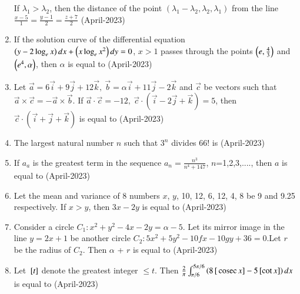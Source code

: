 \documentclass[journal]{IEEEtran}
\numberwithin{equation}{enumi}
\numberwithin{figure}{enumi}
\begin{document}
\begin{enumerate}[start=16]
If $\lambda_1 > \lambda_2$, then the distance of the point $(\lambda_1 - \lambda_2, \lambda_2, \lambda_1)$ 
from the line $\frac{x - 5}{1} = \frac{y - 1}{2} = \frac{z + 7}{2}$
\hfill(April-2023)
\item If the solution curve of the differential equation $\left(y - 2 \log_e x\right)dx + \left(x \log_e x^2\right)dy = 0$, $x > 1$ passes through the points $\left(e, \frac{4}{3}\right)$ and  $\left(e^4, \alpha\right)$, then $\alpha$ is equal to 
\hfill(April-2023)
\item Let \(\vec{a} = 6\vec{i} + 9\vec{j} + 12\vec{k}, \ \vec{b} = \alpha\vec{i} + 11\vec{j} - 2\vec{k}\) and \(\vec{c}\) be vectors such that \(\vec{a} \times \vec{c} = -\vec{a} \times \vec{b}\). If \(\vec{a} \cdot \vec{c} = -12, \ \vec{c} \cdot (\vec{i} - 2\vec{j} + \vec{k}) = 5\), then \(\vec{c} \cdot (\vec{i} + \vec{j} + \vec{k})\) is equal to 
\hfill(April-2023)
\item The largest natural number $n$ such that $3^n$ divides 66! is
\hfill(April-2023)
\item If $a_a$ is the greatest term in the sequence $a_n=\frac{n^3}{n^4 + 147}$, $n$=1,2,3,...., then $a$ is equal to 
\hfill(April-2023)
\item Let the mean and variance of 8 numbers $x$, $y$, 10, 12, 6, 12, 4, 8 be 9 and 9.25 respectively. If $x>y$, then $3x-2y$ is equal to 
\hfill(April-2023)
\item Consider a circle $C_1 : x^2+y^2-4x-2y=\alpha-5$. Let its mirror  image in the line $y=2x+1$ be another circle $C_2 : 5x^2+5y^2 -10fx-10gy+36=0 $.Let $r$ be the radius of $C_2$. Then $\alpha$ + $r$ is equal to
\hfill(April-2023)
\item Let ${}\left[t\right]$ denote the greatest integer $\leq t$. Then $\frac{2}{\pi} \int_{\pi/6}^{5\pi/6} \left(8{}\left[\,\text{cosec}\, x\right] - 5{}\left[\cot x\right] \right) dx$ is equal to 
\hfill(April-2023)






\end{enumerate}
\end{document}
